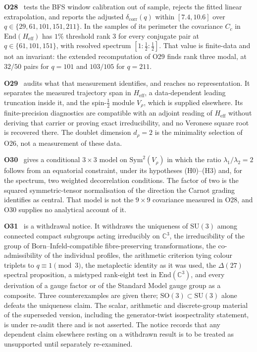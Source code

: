 \documentclass[11pt,a4paper]{article}
\theoremstyle{definition}
\newcommand{\SU}{\mathrm{SU}}
\newcommand{\End}{\mathrm{End}}
\newcommand{\Sym}{\mathrm{Sym}}
\begin{document}
      \textbf{O28}~\cite{Beau2026a32} tests the BFS window calibration out of sample, rejects the
      fitted linear extrapolation, and reports the adjusted $\delta_{\mathrm{corr}}(q)$ within
      $[7.4, 10.6]$ over $q \in \{29, 61, 101, 151, 211\}$.
      In the samples of its perimeter the covariance $C_c$ in $\End(H_{\mathrm{eff}})$ has $1\%$
      threshold rank $3$ for every conjugate pair at $q \in \{61, 101, 151\}$, with resolved
      spectrum $[1 : \tfrac{1}{2} : \tfrac{1}{2}]$.
      That value is finite-data and not an invariant: the extended recomputation of O29 finds rank
      three modal, at $32/50$ pairs for $q = 101$ and $103/105$ for $q = 211$.

      \textbf{O29}~\cite{Beau2026a33} audits what that measurement identifies, and reaches no
      representation.
      It separates the measured trajectory span in $H_{\mathrm{eff}}$, a data-dependent leading
      truncation inside it, and the spin-$\tfrac{1}{2}$ module $V_\rho$, which is supplied
      elsewhere.
      Its finite-precision diagnostics are compatible with an adjoint reading of
      $H_{\mathrm{eff}}$ without deriving that carrier or proving exact irreducibility, and no
      Veronese square root is recovered there.
      The doublet dimension $d_\rho = 2$ is the minimality selection of O26, not a measurement of
      these data.

      \textbf{O30}~\cite{Beau2026a34} gives a conditional $3\times3$ model on $\Sym^2(V_\rho)$ in
      which the ratio $\lambda_1/\lambda_2 = 2$ follows from an equatorial constraint, under its
      hypotheses (H0)--(H3) and, for the spectrum, two weighted decorrelation conditions.
      The factor of two is the squared symmetric-tensor normalisation of the direction the Carnot
      grading identifies as central.
      That model is not the $9\times9$ covariance measured in O28, and O30 supplies no analytical
      account of it.

      \textbf{O31}~\cite{Beau2026a35} is a withdrawal notice.
      It withdraws the uniqueness of $\SU(3)$ among connected compact subgroups acting irreducibly
      on $\mathbb{C}^3$, the irreducibility of the group of Born--Infeld-compatible
      fibre-preserving transformations, the co-admissibility of the individual profiles, the
      arithmetic criterion tying colour triplets to $q \equiv 1 \pmod 3$, the metaplectic identity
      as it was used, the $\Delta(27)$ spectral proposition, a mistyped rank-eight test in
      $\End(\mathbb{C}^3)$, and every derivation of a gauge factor or of the Standard Model gauge
      group as a composite.
      Three counterexamples are given there; $\mathrm{SO}(3) \subset \SU(3)$ alone defeats the uniqueness
      claim.
      The scalar, arithmetic and discrete-group material of the superseded version, including the
      generator-twist isospectrality statement, is under re-audit there and is not asserted.
      The notice records that any dependent claim elsewhere resting on a withdrawn result is to be
      treated as unsupported until separately re-examined.
\end{document}
